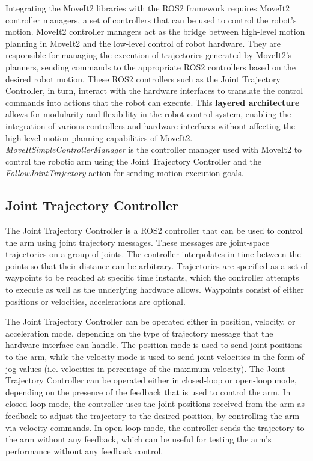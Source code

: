Integrating the MoveIt2 libraries with the ROS2 framework requires MoveIt2 controller managers, 
a set of controllers that can be used to control the robot's motion.
MoveIt2 controller managers act as the bridge between high-level motion planning in MoveIt2
and the low-level control of robot hardware. They are responsible for managing the execution of trajectories
generated by MoveIt2's planners, sending commands to the appropriate ROS2 controllers based on the desired robot motion.
These ROS2 controllers such as the Joint Trajectory Controller, in turn, interact with the hardware interfaces 
to translate the control commands into actions that the robot can execute. This \textbf{layered architecture}
allows for modularity and flexibility in the robot control system, enabling the integration of various controllers
and hardware interfaces without affecting the high-level motion planning capabilities of MoveIt2.
\textit{MoveItSimpleControllerManager} is the controller manager used with MoveIt2 to control the robotic arm
using the Joint Trajectory Controller and the \textit{FollowJointTrajectory} action for sending motion execution goals.

\subsection{Joint Trajectory Controller}

The Joint Trajectory Controller is a ROS2 controller that can be used to control the arm using joint trajectory messages.
These messages are joint-space trajectories on a group of joints.
The controller interpolates in time between the points so that their distance can be arbitrary. 
Trajectories are specified as a set of waypoints to be reached at specific time instants, which the controller 
attempts to execute as well as the underlying hardware allows.
Waypoints consist of either positions or velocities, accelerations are optional.

The Joint Trajectory Controller can be operated either in position, velocity, or acceleration mode, 
depending on the type of trajectory message that the hardware interface can handle.
The position mode is used to send joint positions to the arm, while the velocity mode is used to send joint velocities
in the form of jog values (i.e. velocities in percentage of the maximum velocity). The Joint Trajectory Controller can
be operated either in closed-loop or open-loop mode, depending on the presence of the feedback that is used to control the arm.
In closed-loop mode, the controller uses the joint positions received from the arm as feedback to adjust the trajectory
to the desired position, by controlling the arm via velocity commands. In open-loop mode, the controller sends the
trajectory to the arm without any feedback, which can be useful for testing the arm's performance without any feedback
control.

